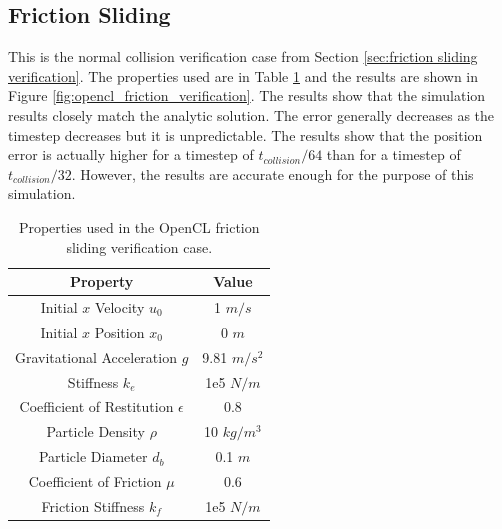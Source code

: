 \documentclass[a4paper,11pt,titlepage]{report}
\begin{document}
\subsection{Friction Sliding}
This is the normal collision verification case from Section \ref{sec:friction sliding verification}. The properties used are in Table \ref{tab:opencl friction sliding properties} and the results are shown in Figure \ref{fig:opencl_friction_verification}. The results show that the simulation results closely match the analytic solution. The error generally decreases as the timestep decreases but it is unpredictable. The results show that the position error is actually higher for a timestep of $t_{collision}/64$ than for a timestep of $t_{collision}/32$. However, the results are accurate enough for the purpose of this simulation.
\begin{table}[!htb]
\centering
\begin{tabular}{| c c |}
\hline
Property & Value\\
\hline
Initial $x$ Velocity $u_0$ & 1 $m/s$ \\
Initial $x$ Position $x_0$ & 0 $m$ \\
Gravitational Acceleration $g$ & 9.81 $m/s^2$ \\
Stiffness $k_e$ & 1e5 $N/m$ \\
Coefficient of Restitution $\epsilon$ & 0.8 \\
Particle Density $\rho$ & 10 $kg/m^3$ \\
Particle Diameter $d_b$ & 0.1 $m$ \\
Coefficient of Friction $\mu$ & 0.6 \\
Friction Stiffness $k_f$ & 1e5 $N/m$ \\
\hline
\end{tabular}
\caption{Properties used in the OpenCL friction sliding verification case.}
\label{tab:opencl friction sliding properties}
\end{table}
\end{document}
